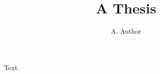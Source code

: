 \documentclass{article}
\title{A Thesis}
\author{A. Author}
\begin{document}
\maketitle
Text.
\end{document}
